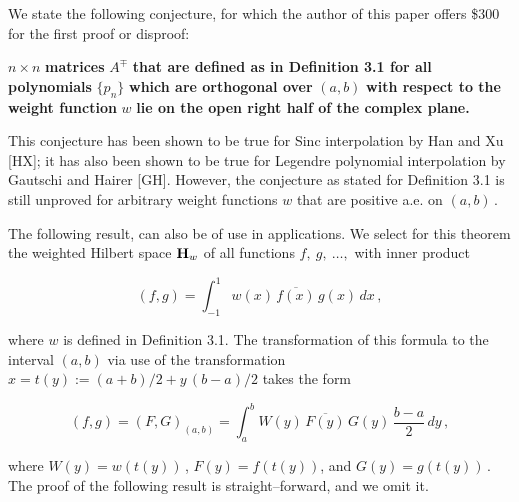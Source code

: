 \documentclass[11pt]{article}
\begin{document}
\vspace{.2in}   We state the following
conjecture, for which the author of this paper offers \$300 for the
first proof or disproof:

\vspace{.1in}  $n
\times n$ {\bf matrices} $A^\mp$ {\bf that are defined as in
  Definition 3.1 for all polynomials} $\{p_n\}$ {\bf which are
  orthogonal over} $(a,b)$ {\bf with respect to the weight function}
$w$ {\bf lie on the open right half of the complex plane.}

\vspace{.1in} \noindent This conjecture has been shown to be true for
Sinc interpolation by Han and Xu [HX]; it has also been shown to be
true for Legendre polynomial interpolation by Gautschi and Hairer
[GH].  However, the conjecture as stated for Definition 3.1 is still
unproved for arbitrary weight functions $w$ that are positive a.e. on
$(a,b)$\,.

\vspace{.2in} \noindent The following result, can also be of use in
applications.  We select for this theorem the weighted Hilbert space
${\bf H}_w$ of all functions $f,\ g,\ \ldots,$ with inner product

\begin{equation}%
  (f,g) = \displaystyle \int_{-1}^1 w(x) \, \overline{f(x)} \, g(x) \, dx\,,
  \label{equation:3.7}
\end{equation}

\noindent where $w$ is defined in Definition 3.1.  The
transformation of this formula to the interval $(a,b)$ via use of the
transformation $x = t(y) := (a+b)/2 + y \, (b-a)/2$ takes the form

\begin{equation}%
  (f,g) = (F,G)_{(a,b)} =  \displaystyle \int_a^b
  W(y) \, \overline{F(y)} \, G(y) \, \frac{b-a}{2} \, dy\,,
  \label{equation:3.8}
\end{equation}

\noindent where $W(y) = w(t(y))$\,, $F(y) = f(t(y))$, and $G(y) =
g(t(y))$\,.  The proof of the following result is straight--forward,
and we omit it.
\end{document}
